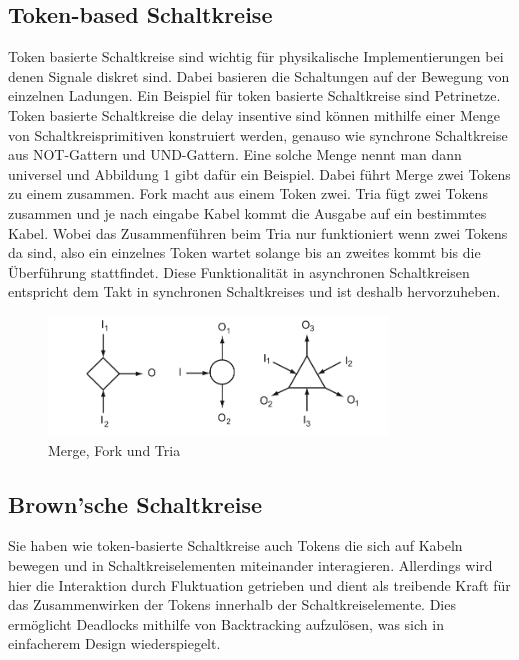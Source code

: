 \subsection{Token-based Schaltkreise}
Token basierte Schaltkreise sind wichtig für physikalische Implementierungen bei
denen Signale diskret sind.
%
Dabei basieren die Schaltungen auf der Bewegung
von einzelnen Ladungen. 
%
Ein Beispiel für token basierte Schaltkreise sind Petrinetze. 
%
Token basierte Schaltkreise die delay insentive sind können mithilfe 
einer Menge von Schaltkreisprimitiven konstruiert werden, genauso 
wie synchrone Schaltkreise aus NOT-Gattern und UND-Gattern.
%
Eine solche Menge nennt man dann universel und Abbildung 1 gibt 
dafür ein Beispiel.
%
Dabei führt Merge zwei Tokens zu einem zusammen.
% 
Fork macht aus einem Token zwei.
%
Tria fügt zwei Tokens zusammen und je nach eingabe Kabel kommt
die Ausgabe auf ein bestimmtes Kabel.
%
Wobei das Zusammenführen beim Tria nur funktioniert wenn zwei Tokens da sind,
also ein einzelnes Token wartet solange bis an zweites kommt bis die 
Überführung stattfindet.
%
Diese Funktionalität in asynchronen Schaltkreisen entspricht dem Takt in
synchronen Schaltkreises und ist deshalb hervorzuheben.
%

\begin{figure}[h]
       \centering
       \includegraphics[width=9cm]{bilder/tokenBased.png}
       \caption{Merge, Fork und Tria}
\end{figure}    

%

\subsection{Brown'sche Schaltkreise}
Sie haben wie token-basierte Schaltkreise auch Tokens die sich auf Kabeln bewegen
und in Schaltkreiselementen miteinander interagieren.
%
Allerdings wird hier die Interaktion durch Fluktuation getrieben und dient
als treibende Kraft für das Zusammenwirken der Tokens innerhalb der
Schaltkreiselemente. 
%
Dies ermöglicht Deadlocks mithilfe 
von Backtracking aufzulösen, was sich in einfacherem Design wiederspiegelt.


